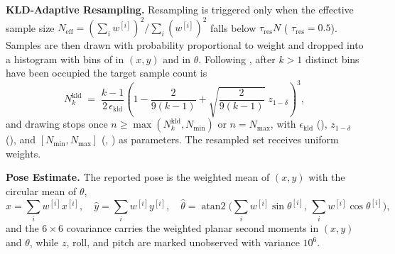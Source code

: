 \noindent\textbf{KLD-Adaptive Resampling.} Resampling is triggered only when the effective sample size $N_{\mathrm{eff}}=(\sum_i w^{[i]})^2/\sum_i (w^{[i]})^2$ falls below $\tau_{\mathrm{res}} N$ ( $\tau_{\mathrm{res}}=0.5$). Samples are then drawn with probability proportional to weight and dropped into a histogram with bins of  in $(x,y)$ and  in $\theta$. Following \citet{fox2003kld}, after $k>1$ distinct bins have been occupied the target sample count is
\begin{equation}\label{eq:kld}
  N^{\mathrm{kld}}_k \;=\; \frac{k-1}{2\,\epsilon_{\mathrm{kld}}}\left(1-\frac{2}{9(k-1)}+\sqrt{\frac{2}{9(k-1)}}\;z_{1-\delta}\right)^{3},
\end{equation}
and drawing stops once $n\ge\max(N^{\mathrm{kld}}_k,N_{\min})$ or $n=N_{\max}$, with $\epsilon_{\mathrm{kld}}$ (), $z_{1-\delta}$ (), and $[N_{\min},N_{\max}]$ (, ) as parameters. The resampled set receives uniform weights.

\noindent\textbf{Pose Estimate.} The reported pose is the weighted mean of $(x,y)$ with the circular mean of $\theta$,
\begin{equation}\label{eq:estimate}
  \hat{x}=\textstyle\sum_i w^{[i]}x^{[i]},\quad \hat{y}=\sum_i w^{[i]}y^{[i]},\quad \hat{\theta}=\operatorname{atan2}\!\big(\sum_i w^{[i]}\sin\theta^{[i]},\,\sum_i w^{[i]}\cos\theta^{[i]}\big),
\end{equation}
and the $6\times6$ covariance carries the weighted planar second moments in $(x,y)$ and $\theta$, while $z$, roll, and pitch are marked unobserved with variance $10^{6}$.

\begin{algorithm}[t]
\caption{One / filter update, as wired in }\label{alg:mcl}
\end{algorithm}

